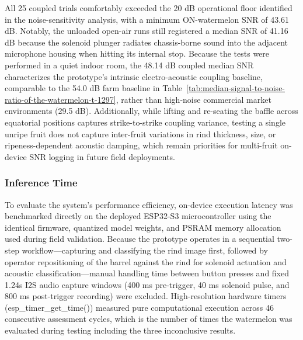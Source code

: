 \begin{thesisprose}
All 25 coupled trials comfortably exceeded the 20 dB operational floor identified in the noise-sensitivity analysis, with a minimum ON-watermelon SNR of 43.61 dB. Notably, the unloaded open-air runs still registered a median SNR of 41.16 dB because the solenoid plunger radiates chassis-borne sound into the adjacent microphone housing when hitting its internal stop. Because the tests were performed in a quiet indoor room, the 48.14 dB coupled median SNR characterizes the prototype's intrinsic electro-acoustic coupling baseline, comparable to the 54.0 dB farm baseline in Table~\ref{tab:median-signal-to-noise-ratio-of-the-watermelon-t-1297}, rather than high-noise commercial market environments (29.5 dB). Additionally, while lifting and re-seating the baffle across equatorial positions captures strike-to-strike coupling variance, testing a single unripe fruit does not capture inter-fruit variations in rind thickness, size, or ripeness-dependent acoustic damping, which remain priorities for multi-fruit on-device SNR logging in future field deployments.

\subsubsection{Inference Time}

To evaluate the system's performance efficiency, on-device execution latency was benchmarked directly on the deployed ESP32-S3 microcontroller using the identical firmware, quantized model weights, and PSRAM memory allocation used during field validation. Because the prototype operates in a sequential two-step workflow—capturing and classifying the rind image first, followed by operator repositioning of the barrel against the rind for solenoid actuation and acoustic classification—manual handling time between button presses and fixed 1.24s I2S audio capture windows (400 ms pre-trigger, 40 ms solenoid pulse, and 800 ms post-trigger recording) were excluded. High-resolution hardware timers (esp\_\allowbreak{}timer\_\allowbreak{}get\_\allowbreak{}time()) measured pure computational execution across 46 consecutive assessment cycles, which is the number of times the watermelon was evaluated during testing including the three inconclusive results.


\end{thesisprose}
